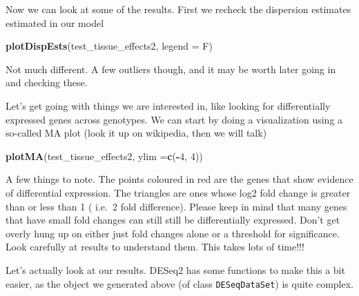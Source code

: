 \documentclass[
]{article}
\newenvironment{Shaded}{\begin{snugshade}}{\end{snugshade}}
\newcommand{\DataTypeTok}[1]{\textcolor[rgb]{0.13,0.29,0.53}{#1}}
\newcommand{\DecValTok}[1]{\textcolor[rgb]{0.00,0.00,0.81}{#1}}
\newcommand{\KeywordTok}[1]{\textcolor[rgb]{0.13,0.29,0.53}{\textbf{#1}}}
\newcommand{\NormalTok}[1]{#1}
\newcommand{\OperatorTok}[1]{\textcolor[rgb]{0.81,0.36,0.00}{\textbf{#1}}}
\begin{document}
Now we can look at some of the results. First we recheck the dispersion
estimates estimated in our model

\begin{Shaded}
\begin{Highlighting}[]
\KeywordTok{plotDispEsts}\NormalTok{(test_tissue_effects2,}
             \DataTypeTok{legend =}\NormalTok{ F)}
\end{Highlighting}
\end{Shaded}

Not much different. A few outliers though, and it may be worth later
going in and checking these.

Let's get going with things we are interested in, like looking for
differentially expressed genes across genotypes. We can start by doing a
visualization using a so-called MA plot (look it up on wikipedia, then
we will talk)

\begin{Shaded}
\begin{Highlighting}[]
\KeywordTok{plotMA}\NormalTok{(test_tissue_effects2, }
       \DataTypeTok{ylim =}\KeywordTok{c}\NormalTok{(}\OperatorTok{-}\DecValTok{4}\NormalTok{, }\DecValTok{4}\NormalTok{))}
\end{Highlighting}
\end{Shaded}

A few things to note. The points coloured in red are the genes that show
evidence of differential expression. The triangles are ones whose log2
fold change is greater than or less than 1 ( i.e.~2 fold difference).
Please keep in mind that many genes that have small fold changes can
still still be differentially expressed. Don't get overly hung up on
either just fold changes alone or a threshold for significance. Look
carefully at results to understand them. This takes lots of time!!!

Let's actually look at our results. DESeq2 has some functions to make
this a bit easier, as the object we generated above (of class
\texttt{DESeqDataSet}) is quite complex.
\end{document}
